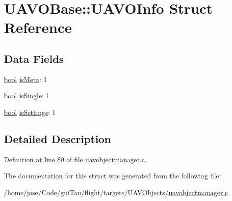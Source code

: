 \hypertarget{struct_u_a_v_o_base_1_1_u_a_v_o_info}{\section{U\-A\-V\-O\-Base\-:\-:U\-A\-V\-O\-Info Struct Reference}
\label{struct_u_a_v_o_base_1_1_u_a_v_o_info}
}
\subsection*{Data Fields}
\begin{DoxyCompactItemize}
\item 
\hyperlink{group___exported__types_gaf6a258d8f3ee5206d682d799316314b1}{bool} \hyperlink{group___u_a_v_ga5358cdae3a703bf0ad8b1bb4fc19d1ca}{is\-Meta}\-: 1
\item 
\hyperlink{group___exported__types_gaf6a258d8f3ee5206d682d799316314b1}{bool} \hyperlink{group___u_a_v_ga2ac5c0e20d294c304f14e18fd2fdc61a}{is\-Single}\-: 1
\item 
\hyperlink{group___exported__types_gaf6a258d8f3ee5206d682d799316314b1}{bool} \hyperlink{group___u_a_v_ga24c38e3db94c7b88d4dd0cfdd2736b4d}{is\-Settings}\-: 1
\end{DoxyCompactItemize}


\subsection{Detailed Description}


Definition at line 80 of file uavobjectmanager.\-c.



The documentation for this struct was generated from the following file\-:\begin{DoxyCompactItemize}
\item 
/home/jose/\-Code/gui\-Tau/flight/targets/\-U\-A\-V\-Objects/\hyperlink{uavobjectmanager_8c}{uavobjectmanager.\-c}\end{DoxyCompactItemize}
